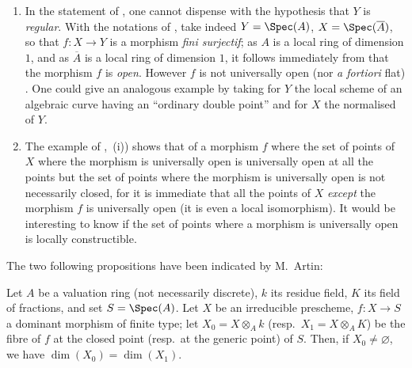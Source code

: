 \begin{remarks}[14.3.9]
\label{IV.14.3.9}
\begin{enumerate}[label=(\roman*)]
  \item In the statement of , one cannot dispense with the hypothesis that $Y$ is \emph{regular}.
  With the notations of , take indeed $Y=\Spec(A)$, $X=\Spec(\overline{A})$, so that $f:X\to Y$ is a morphism \emph{fini surjectif}; as $A$ is a local ring of dimension $1$, and as $\overline{A}$ is a local ring of dimension $1$, it follows immediately from  that the morphism $f$ is \emph{open}.
  However $f$ is not universally open (nor \emph{a fortiori} flat) .
  One could give an analogous example by taking for $Y$ the local scheme of an algebraic curve having an ``ordinary double point'' and for $X$ the normalised of $Y$.

  \item The example of ,~(i)) shows that of a morphism $f$ where the set of points of $X$ where the morphism is universally open is universally open at all the points but the set of points where the morphism is universally open is not necessarily closed, for it is immediate that all the points of $X$ \emph{except} the morphism $f$ is universally open (it is even a local isomorphism).
  It would be interesting to know if the set of points where a morphism is universally open is locally constructible.
\end{enumerate}
\end{remarks}

The two following propositions have been indicated by M.\ Artin:

\begin{lemma}[14.3.10]
\label{IV.14.3.10}
Let $A$ be a valuation ring (not necessarily discrete), $k$ its residue field, $K$ its field of fractions, and set $S=\Spec(A)$.
Let $X$ be an irreducible prescheme, $f:X\to S$ a dominant morphism of finite type; let $X_0=X\otimes_A k$ (resp.\ $X_1=X\otimes_A K$) be the fibre of $f$ at the closed point (resp.\ at the generic point) of $S$.
Then, if $X_0\neq\varnothing$, we have $\dim(X_0)=\dim(X_1)$.
\end{lemma}

